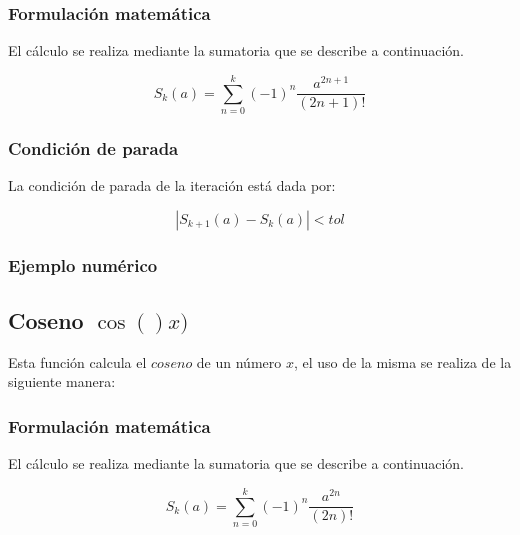 \documentclass[10pt,a4paper]{article}
\begin{document}
	\begin{center}
	\end{center}
	
	\subsubsection{Formulación matemática}
	
	El cálculo se realiza mediante la sumatoria que se describe a continuación.
	
	\begin{equation}\label{key6}
		S_{k}(a) = \sum_{n=0}^{k}(-1)^{n}\frac{a^{2n + 1}}{(2n + 1)!}
	\end{equation}
	
	\subsubsection{Condición de parada}
	
	La condición de parada de la iteración está dada por: 
	
	\begin{equation}\label{key7}
		\left\lvert S_{k+1}(a) - S_{k}(a) \right\lvert < tol
	\end{equation}
	
	
	\subsubsection{Ejemplo numérico}
	
	\subsection{Coseno $\cos()x)$}
	
	Esta función calcula el $coseno$ de un número $x$, el uso de la misma se realiza de la siguiente manera:
	
		\begin{center}
	\end{center}
	
	\subsubsection{Formulación matemática}
	
	El cálculo se realiza mediante la sumatoria que se describe a continuación.
	
	\begin{equation}\label{key8}
		S_{k}(a) = \sum_{n=0}^{k}(-1)^{n}\frac{a^{2n}}{(2n)!}
	\end{equation}
	
\end{document}
